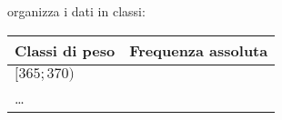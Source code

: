 \begin{esercizio}
\begin{enumeratea}

\item organizza i dati in classi:
\begin{center}
\begin{tabular}{lc}
\toprule
Classi di peso & Frequenza assoluta\\
\midrule
$[365; 370)$ & \\
\ldots & \\
\bottomrule
\end{tabular}
\end{center}
\end{enumeratea}
\end{esercizio}

